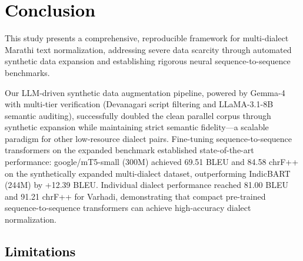 % 
% 


\clearpage
\section{\textcolor{black}{Conclusion}}
\label{sec:conclusion}

This study presents a comprehensive, reproducible framework for multi-dialect Marathi text normalization, addressing severe data scarcity through automated synthetic data expansion and establishing rigorous neural sequence-to-sequence benchmarks.

Our LLM-driven synthetic data augmentation pipeline, powered by Gemma-4 with multi-tier verification (Devanagari script filtering and LLaMA-3.1-8B semantic auditing), successfully doubled the clean parallel corpus through synthetic expansion while maintaining strict semantic fidelity---a scalable paradigm for other low-resource dialect pairs.
Fine-tuning sequence-to-sequence transformers on the expanded benchmark established state-of-the-art performance: google/mT5-small (300M) achieved 69.51 BLEU and 84.58 chrF++ on the synthetically expanded multi-dialect dataset, outperforming IndicBART (244M) by +12.39 BLEU.
Individual dialect performance reached 81.00 BLEU and 91.21 chrF++ for Varhadi, demonstrating that compact pre-trained sequence-to-sequence transformers can achieve high-accuracy dialect normalization.

\subsection{\textcolor{black}{Limitations}}

